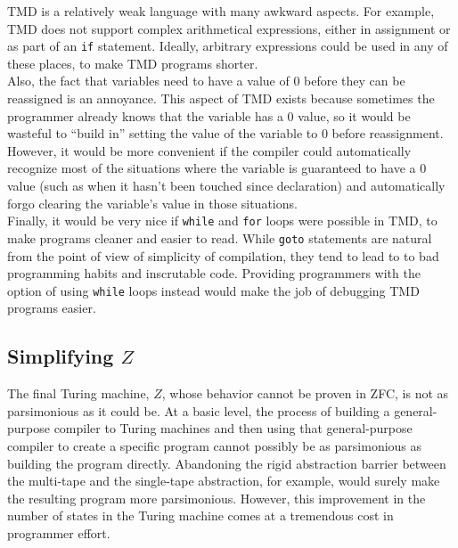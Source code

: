 \documentclass[11pt]{report}
\begin{document}
TMD is a relatively weak language with many awkward aspects. For example, TMD does not support complex arithmetical expressions, either in assignment or as part of an \texttt{if} statement. Ideally, arbitrary expressions could be used in any of these places, to make TMD programs shorter. \\

Also, the fact that variables need to have a value of 0 before they can be reassigned is an annoyance. This aspect of TMD exists because sometimes the programmer already knows that the variable has a 0 value, so it would be wasteful to ``build in'' setting the value of the variable to 0 before reassignment. However, it would be more convenient if the compiler could automatically recognize most of the situations where the variable is guaranteed to have a 0 value (such as when it hasn't been touched since declaration) and automatically forgo clearing the variable's value in those situations. \\

Finally, it would be very nice if \texttt{while} and \texttt{for} loops were possible in TMD, to make programs cleaner and easier to read. While \texttt{goto} statements are natural from the point of view of simplicity of compilation, they tend to lead to to bad programming habits and inscrutable code. Providing programmers with the option of using \texttt{while} loops instead would make the job of debugging TMD programs easier. 

\subsection{Simplifying $Z$}

The final Turing machine, $Z$, whose behavior cannot be proven in ZFC, is not as parsimonious as it could be. At a basic level, the process of building a general-purpose compiler to Turing machines and then using that general-purpose compiler to create a specific program cannot possibly be as parsimonious as building the program directly. Abandoning the rigid abstraction barrier between the multi-tape and the single-tape abstraction, for example, would surely make the resulting program more parsimonious. However, this improvement in the number of states in the Turing machine comes at a tremendous cost in programmer effort. \\
\end{document}
